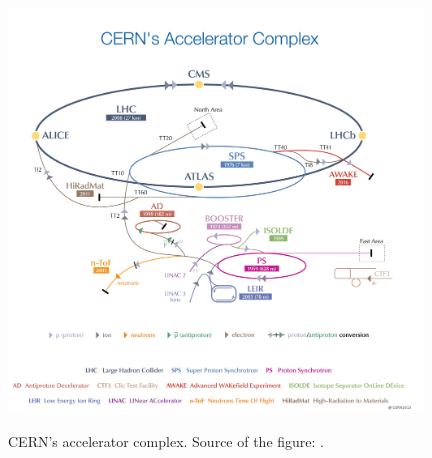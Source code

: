 \begin{figure}[htb]
  \begin{center}
    {\includegraphics[width=0.98\textwidth]{../figs/Exp/CERN_accelerator_complex2013.jpg}}
    \caption{CERN's accelerator complex. Source of the figure: \cite{ref_fig_CERNacceleratorComplex}.}
    \label{fig:CERN_accelerator_complex}
  \end{center}
\end{figure}

